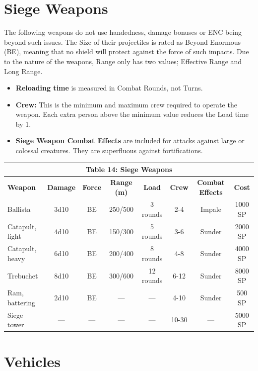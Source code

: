 \documentclass[10pt]{article}
\begin{document}
\section{Siege Weapons}
\label{sec:siege-weapons}

The following weapons do not use handedness, damage bonuses or ENC being beyond such issues. The Size of their projectiles is rated as Beyond Enormous (BE), meaning that no shield will protect against the force of such impacts. Due to the nature of the weapons, Range only has two values; Effective Range and Long Range.


\begin{itemize}
    \item \textbf{Reloading time} is measured in Combat Rounds, not Turns.
    \item \textbf{Crew:} This is the minimum and maximum crew required to operate the weapon. Each extra person above the minimum value reduces the Load time by 1.
    \item \textbf{Siege Weapon Combat Effects} are included for attacks against large or colossal creatures. They are superfluous against fortifications.
\end{itemize}

\begin{longtable}[c]{|l|c|c|c|c|c|c|c|}
\hline
\multicolumn{8}{|c|}{\textbf{Table 14: Siege Weapons}} \\
\hline
\textbf{Weapon} & \textbf{Damage} & \textbf{Force} & \textbf{Range (m)} & \textbf{Load} & \textbf{Crew} & \textbf{Combat Effects} & \textbf{Cost} \\
\hline
Ballista & 3d10 & BE & 250/500 & 3 rounds & 2-4 & Impale & 1000 SP \\
\hline
Catapult, light & 4d10 & BE & 150/300 & 5 rounds & 3-6 & Sunder & 2000 SP \\
\hline
Catapult, heavy & 6d10 & BE & 200/400 & 8 rounds & 4-8 & Sunder & 4000 SP \\
\hline
Trebuchet & 8d10 & BE & 300/600 & 12 rounds & 6-12 & Sunder & 8000 SP \\
\hline
Ram, battering & 2d10 & BE & — & — & 4-10 & Sunder & 500 SP \\
\hline
Siege tower & — & — & — & — & 10-30 & — & 5000 SP \\
\hline
\end{longtable}

\section{Vehicles}
\label{sec:vehicles}
\end{document}
